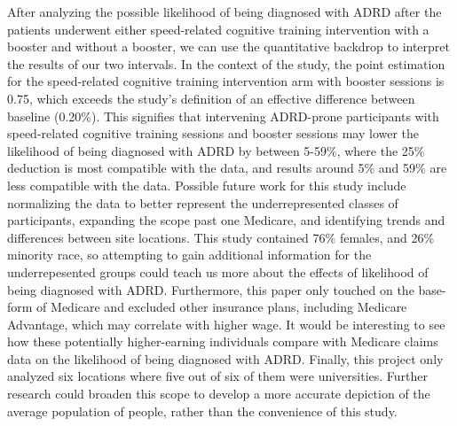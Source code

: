 \documentclass[11pt]{article}
\begin{document}
After analyzing the possible likelihood of being diagnosed with ADRD after the patients underwent either speed-related cognitive training intervention with a booster and without a booster, we can use the quantitative backdrop to interpret the results of our two intervals. In the context of the study, the point estimation for the speed-related cognitive training intervention arm with booster sessions is 0.75, which exceeds the study's definition of an effective difference between baseline (0.20\%). This signifies that intervening ADRD-prone participants with speed-related cognitive training sessions and booster sessions may lower the likelihood of being diagnosed with ADRD by between 5-59\%, where the 25\% deduction is most compatible with the data, and results around 5\% and 59\% are less compatible with the data. Possible future work for this study include normalizing the data to better represent the underrepresented classes of participants, expanding the scope past one Medicare, and identifying trends and differences between site locations. This study contained 76\% females, and 26\% minority race, so attempting to gain additional information for the underrepesented groups could teach us more about the effects of likelihood of being diagnosed with ADRD. Furthermore, this paper only touched on the base-form of Medicare and excluded other insurance plans, including Medicare Advantage, which may correlate with higher wage. It would be interesting to see how these potentially higher-earning individuals compare with Medicare claims data on the likelihood of being diagnosed with ADRD. Finally, this project only analyzed six locations where five out of six of them were universities. Further research could broaden this scope to develop a more accurate depiction of the average population of people, rather than the convenience of this study.
\end{document}
